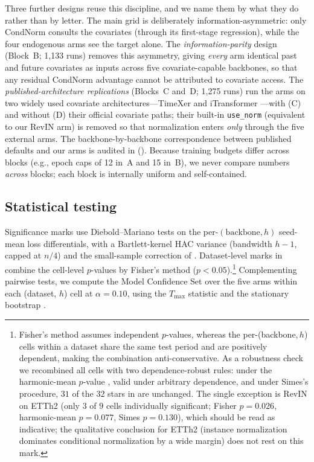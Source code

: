 Three further designs reuse this discipline, and we name them by what they do rather than by letter. The main grid is deliberately information-asymmetric: only CondNorm consults the covariates (through its first-stage regression), while the four endogenous arms see the target alone. The \emph{information-parity} design (Block~B; 1{,}133 runs) removes this asymmetry, giving \emph{every} arm identical past and future covariates as inputs across five covariate-capable backbones, so that any residual CondNorm advantage cannot be attributed to covariate access. The \emph{published-architecture replications} (Blocks~C and~D; 1{,}275 runs) run the arms on two widely used covariate architectures---TimeXer and iTransformer \citep{wang2024timexer,liu2024itransformer}---with (C) and without (D) their official covariate paths; their built-in \texttt{use\_norm} (equivalent to our RevIN arm) is removed so that normalization enters \emph{only} through the five external arms. The backbone-by-backbone correspondence between published defaults and our arms is audited in  (). Because training budgets differ across blocks (e.g., epoch caps of 12 in~A and 15 in~B), we never compare numbers \emph{across} blocks; each block is internally uniform and self-contained.

\subsection{Statistical testing}

Significance marks use Diebold--Mariano tests \citep{diebold1995comparing} on the per-$(\text{backbone},h)$ seed-mean loss differentials, with a Bartlett-kernel HAC variance (bandwidth $h-1$, capped at $n/4$) and the small-sample correction of \citet{harvey1997testing}. Dataset-level marks in  combine the cell-level $p$-values by Fisher's method ($p<0.05$).\footnote{Fisher's method assumes independent $p$-values, whereas the
per-(backbone,\,$h$) cells within a dataset share the same test period and
are positively dependent, making the combination anti-conservative. As a
robustness check we recombined all cells with two dependence-robust rules:
under the harmonic-mean $p$-value \citep{wilson2019hmp}, valid under
arbitrary dependence, and under Simes's procedure, $31$ of the $32$ stars
in  are unchanged. The single exception is RevIN on ETTh2
(only $3$ of $9$ cells individually significant; Fisher $p=0.026$,
harmonic-mean $p=0.077$, Simes $p=0.130$), which should be read as
indicative; the qualitative conclusion for ETTh2 (instance normalization
dominates conditional normalization by a wide margin) does not rest on
this mark.} Complementing pairwise tests, we compute the Model Confidence Set \citep{hansen2011mcs} over the five arms within each (dataset, $h$) cell at $\alpha=0.10$, using the $T_{\max}$ statistic and the stationary bootstrap \citep{politis1994stationary}.

